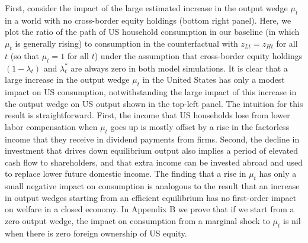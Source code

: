 \documentclass[11pt]{article}
\begin{document}
First, consider the impact of the large estimated increase in the output wedge $\mu _{t}$ in a world with no cross-border equity holdings (bottom right panel). Here, we plot the ratio of the path of US household consumption in our baseline (in which $\mu _{t}$ is generally rising) to consumption in the counterfactual with $z_{Lt}=z_{Ht}$ for all $t$ (so that $\mu _{t}=1$ for all $t$) under the assumption that cross-border equity holdings $(1-\lambda _{t})$ and $\lambda _{t}^{*}$ are always zero in both model simulations. It is clear that a large increase in the output wedge $\mu _{t}$ in the United States has only a modest impact on US consumption, notwithstanding the large impact of this increase in the output wedge on US output shown in the top-left panel. The intuition for this result is straightforward. First, the income that US households lose from lower labor compensation when $\mu _{t}$ goes up is mostly offset by a rise in the factorless income that they receive in dividend payments from firms. Second, the decline in investment that drives down equilibrium output also implies a period of elevated cash flow to shareholders, and that extra income can be invested abroad and used to replace lower future domestic income. The finding that a rise in $\mu _{t}$ has only a small negative impact on consumption is analogous to the result that an increase in output wedges starting from an efficient equilibrium has no first-order impact on welfare in a closed economy. In Appendix B we prove that if we start from a zero output wedge, the impact on consumption from a marginal shock to $\mu _{t}$ is nil when there is zero foreign ownership of US equity.
\end{document}
